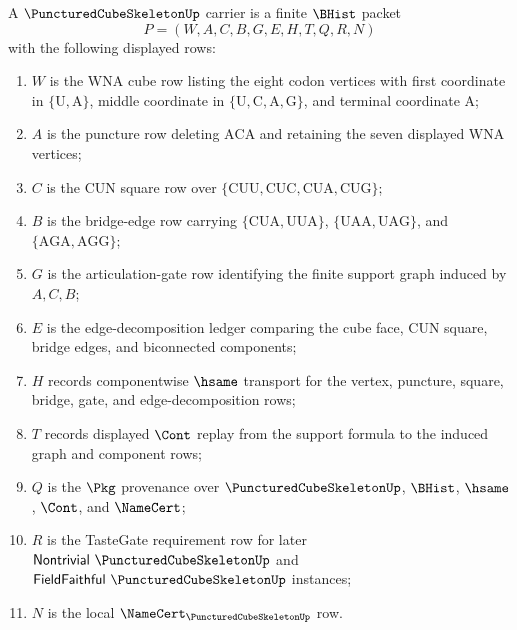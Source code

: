 \begin{definition}
\label{def:punctured-cube-skeleton-carrier}
A $\PuncturedCubeSkeletonUp$ carrier is a finite $\BHist$ packet
$$
P=(W,A,C,B,G,E,H,T,Q,R,N)
$$
with the following displayed rows:
\begin{enumerate}
\item $W$ is the WNA cube row listing the eight codon vertices with first coordinate in $\{\mathrm{U},\mathrm{A}\}$, middle coordinate in $\{\mathrm{U},\mathrm{C},\mathrm{A},\mathrm{G}\}$, and terminal coordinate $\mathrm{A}$;
\item $A$ is the puncture row deleting $\mathrm{ACA}$ and retaining the seven displayed WNA vertices;
\item $C$ is the CUN square row over $\{\mathrm{CUU},\mathrm{CUC},\mathrm{CUA},\mathrm{CUG}\}$;
\item $B$ is the bridge-edge row carrying $\{\mathrm{CUA},\mathrm{UUA}\}$, $\{\mathrm{UAA},\mathrm{UAG}\}$, and $\{\mathrm{AGA},\mathrm{AGG}\}$;
\item $G$ is the articulation-gate row identifying the finite support graph induced by $A,C,B$;
\item $E$ is the edge-decomposition ledger comparing the cube face, CUN square, bridge edges, and biconnected components;
\item $H$ records componentwise $\hsame$ transport for the vertex, puncture, square, bridge, gate, and edge-decomposition rows;
\item $T$ records displayed $\Cont$ replay from the support formula to the induced graph and component rows;
\item $Q$ is the $\Pkg$ provenance over $\PuncturedCubeSkeletonUp$, $\BHist$, $\hsame$, $\Cont$, and $\NameCert$;
\item $R$ is the TasteGate requirement row for later $\mathsf{Nontrivial}\ \PuncturedCubeSkeletonUp$ and $\mathsf{FieldFaithful}\ \PuncturedCubeSkeletonUp$ instances;
\item $N$ is the local $\NameCert_{\PuncturedCubeSkeletonUp}$ row.
\end{enumerate}
\end{definition}

